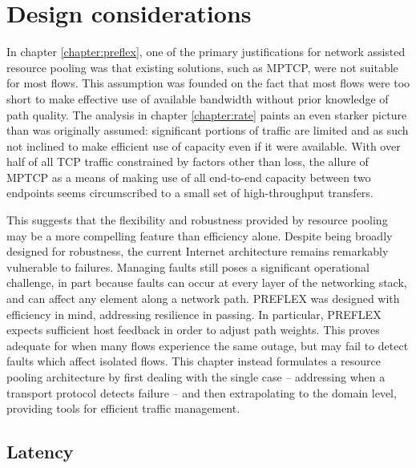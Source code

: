 \section{Design considerations}
\label{section:inflex:design}

In chapter \ref{chapter:preflex}, one of the primary justifications for network assisted resource pooling was that existing solutions, such as \ac{MPTCP}, were not suitable for most flows. 
This assumption was founded on the fact that most flows were too short to make effective use of available bandwidth without prior knowledge of path quality.
The analysis in chapter \ref{chapter:rate} paints an even starker picture than was originally assumed: significant portions of traffic are limited and as such not inclined to make efficient use of capacity even if it were available.
With over half of all \ac{TCP} traffic constrained by factors other than loss, the allure of \ac{MPTCP} as a means of making use of all end-to-end capacity between two endpoints seems circumscribed to a small set of high-throughput transfers.

This suggests that the flexibility and robustness provided by resource pooling may be a more compelling feature than efficiency alone.
Despite being broadly designed for robustness, the current Internet architecture remains remarkably vulnerable to failures.
Managing faults still poses a significant operational challenge, in part because faults can occur at every layer of the networking stack, and can affect any element along a network path. 
\ac{PREFLEX} was designed with efficiency in mind, addressing resilience in passing.
In particular, \ac{PREFLEX} expects sufficient host feedback in order to adjust path weights.
This proves adequate for when many flows experience the same outage, but may fail to detect faults which affect isolated flows.
This chapter instead formulates a resource pooling architecture by first dealing with the single case -- addressing when a transport protocol detects failure -- and then extrapolating to the domain level, providing tools for efficient traffic management.

\subsection{Latency}

